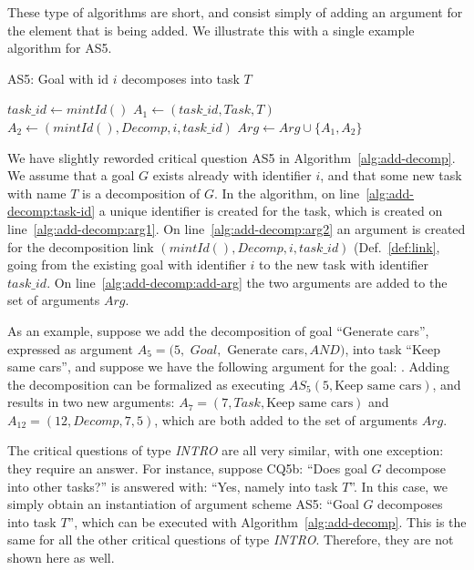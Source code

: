 These type of algorithms are short, and consist simply of adding an argument for the element that is being added. We illustrate this with a single example algorithm for AS5.

\begin{algorithm}[h]
  \caption{AS5: Goal with id $i$ decomposes into task $T$}\label{alg:add-decomp}
  \begin{algorithmic}[1]
    \State $task\_id\gets mintId()$\label{alg:add-decomp:task-id}
    \State $A_1\leftarrow (task\_id, Task, T)$\label{alg:add-decomp:arg1}
    \State $A_2\leftarrow (mintId(), Decomp, i, task\_id)$\label{alg:add-decomp:arg2}
    \State $Arg\gets Arg\cup \{A_1,A_2\}$\label{alg:add-decomp:add-arg}
    \EndProcedure
  \end{algorithmic}
\end{algorithm}

We have slightly reworded critical question AS5 in Algorithm~\ref{alg:add-decomp}. We assume that a goal $G$ exists already with identifier $i$, and that some new task with name $T$ is a decomposition of $G$. In the algorithm, on line~\ref{alg:add-decomp:task-id} a unique identifier is created for the task, which is created on line~\ref{alg:add-decomp:arg1}. On line~\ref{alg:add-decomp:arg2} an argument is created for the decomposition link $(mintId(), Decomp, i, task\_id)$ (Def.~\ref{def:link}, going from the existing goal with identifier $i$ to the new task with identifier $task\_id$. On line~\ref{alg:add-decomp:add-arg} the two arguments are added to the set of arguments $Arg$.

As an example, suppose we add the decomposition of goal ``Generate cars'', expressed as argument $A_5 = (5,$ $Goal,$ Generate cars$, AND)$, into task ``Keep same cars'', and suppose we have the following argument for the goal: . Adding the decomposition can be formalized as executing $AS_5(5, \text{Keep same cars})$, and results in two new arguments: $A_7 = (7, Task, \text{Keep same cars})$ and $A_{12} = (12, Decomp, 7, 5)$, which are both added to the set of arguments $Arg$.

The critical questions of type \emph{INTRO} are all very similar, with one exception: they require an answer. For instance, suppose CQ5b: ``Does goal $G$ decompose into other tasks?'' is answered with: ``Yes, namely into task $T$''. In this case, we simply obtain an instantiation of argument scheme AS5: ``Goal $G$ decomposes into task $T$'', which can be executed with Algorithm~\ref{alg:add-decomp}. This is the same for all the other critical questions of type \emph{INTRO}. Therefore, they are not shown here as well.


